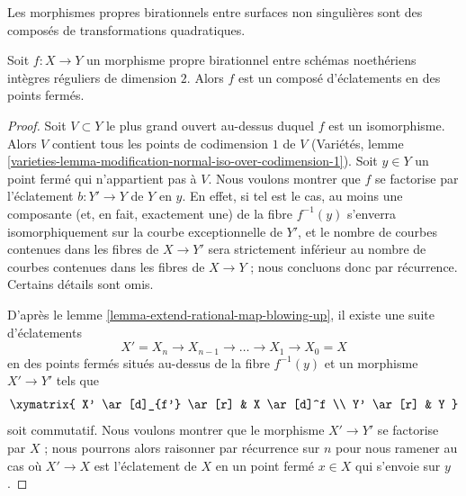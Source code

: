 \noindent Les morphismes propres birationnels entre surfaces non singulières sont des composés de transformations quadratiques.

\begin{lemma} \label{lemma-proper-birational-regular-surfaces} Soit $f : X \to Y$ un morphisme propre birationnel entre schémas noethériens intègres réguliers de dimension $2$. Alors $f$ est un composé d'éclatements en des points fermés. \end{lemma}

\begin{proof} Soit $V \subset Y$ le plus grand ouvert au-dessus duquel $f$ est un isomorphisme. Alors $V$ contient tous les points de codimension $1$ de $V$ (Variétés, lemme \ref{varieties-lemma-modification-normal-iso-over-codimension-1}). Soit $y \in Y$ un point fermé qui n'appartient pas à $V$. Nous voulons montrer que $f$ se factorise par l'éclatement $b : Y' \to Y$ de $Y$ en $y$. En effet, si tel est le cas, au moins une composante (et, en fait, exactement une) de la fibre $f^{-1}(y)$ s'enverra isomorphiquement sur la courbe exceptionnelle de $Y'$, et le nombre de courbes contenues dans les fibres de $X \to Y'$ sera strictement inférieur au nombre de courbes contenues dans les fibres de $X \to Y$ ; nous concluons donc par récurrence. Certains détails sont omis.

\medskip\noindent D'après le lemme \ref{lemma-extend-rational-map-blowing-up}, il existe une suite d'éclatements $$
X' = X_n \to X_{n - 1} \to \ldots \to X_1 \to X_0 = X
$$ en des points fermés situés au-dessus de la fibre $f^{-1}(y)$ et un morphisme $X' \to Y'$ tels que $$
\xymatrix{
X' \ar[d]_{f'} \ar[r] & X \ar[d]^f \\
Y' \ar[r] & Y
}
$$ soit commutatif. Nous voulons montrer que le morphisme $X' \to Y'$ se factorise par $X$ ; nous pourrons alors raisonner par récurrence sur $n$ pour nous ramener au cas où $X' \to X$ est l'éclatement de $X$ en un point fermé $x \in X$ qui s'envoie sur $y$.


\end{proof}
